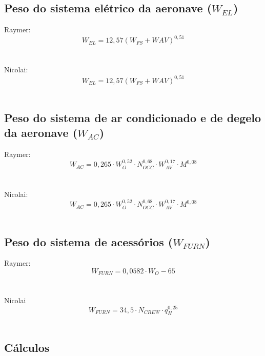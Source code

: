  \subsection{Peso do sistema elétrico da aeronave ($W_{EL}$)}

    Raymer:
    \begin{equation*}
  		W_{EL} = 12,57 \left(
					W_{FS} + W{AV}
				\right) ^{0,51}
    \end{equation*}
		\\~\\
    Nicolai:
    \begin{equation*}
  		W_{EL} = 12,57 \left(
					W_{FS} + W{AV}
				\right) ^{0,51}
    \end{equation*}
		\\

  \subsection{Peso do sistema de ar condicionado e de degelo da aeronave ($W_{AC}$)}

    Raymer:
    \begin{equation*}
  		W_{AC} = 0,265 \cdot
				W_O^{0,52} \cdot
				N_{OCC}^{0,68} \cdot
				W_{AV}^{0,17} \cdot
				M^{0,08}
    \end{equation*}
		\\~\\
    Nicolai:
    \begin{equation*}
  		W_{AC} = 0,265 \cdot
				W_O^{0,52} \cdot
				N_{OCC}^{0,68} \cdot
				W_{AV}^{0,17} \cdot
				M^{0,08}
    \end{equation*}
		\\

  \subsection{Peso do sistema de acessórios ($W_{FURN}$)}

    Raymer:
    \begin{equation*}
  		W_{FURN} = 0,0582 \cdot W_O - 65
    \end{equation*}
		\\~\\
    Nicolai
    \begin{equation*}
  		W_{FURN} = 34,5 \cdot N_{CREW} \cdot q_H^{0,25}
    \end{equation*}
		\\

  \subsection{Cálculos}

